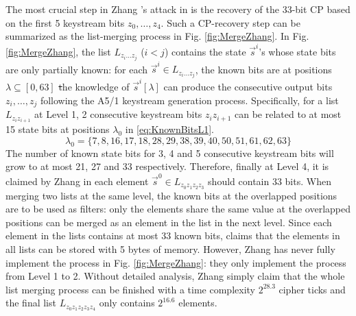 The most crucial step in Zhang \etal's attack in \cite{AC:Zhang19} is the recovery of the 33-bit CP based on the first 5 keystream bits $z_0,\ldots, z_4$.
Such a CP-recovery step can be summarized as the list-merging process in Fig. \ref{fig:MergeZhang}.
In Fig. \ref{fig:MergeZhang}, the list $L_{z_i\ldots z_j}$ ($i<j$) contains the state $\vec{s}^i$'s whose state bits are only partially known:
for each $\vec{s}^i\in L_{z_i\ldots z_j}$, the known bits are at positions $\lambda\subseteq [0,63]$ \st the knowledge of $\vec{s}^i[\lambda]$ can produce the consecutive output bits $z_i,\ldots, z_j$ following the A5/1 keystream generation process.
Specifically, for a list $L_{z_iz_{i+1}}$ at Level 1, 2 consecutive keystream bits $z_iz_{i+1}$ can be related to at most 15 state bits at positions $\lambda_0$ in \eqref{eq:KnownBitsL1}.
\begin{equation}\label{eq:KnownBitsL1}
\lambda_0=\{7,8,16,17,18,  28,29,38,39,40,  50,51,61,62,63\}
\end{equation}
The number of known state bits for 3, 4 and 5 consecutive keystream bits will grow to at most 21, 27 and 33 respectively.
Therefore, finally at Level 4, it is claimed by Zhang \etal in \cite{AC:Zhang19} each element $\vec{s}^0\in L_{z_0z_1z_2z_3}$ should contain 33 bits.
When merging two lists at the same level, the known bits at the overlapped positions are to be used as filters: only the elements share the same value at the overlapped positions can be merged as an element in the list in the next level.
Since each element in the lists contains at most 33 known bits, \cite{AC:Zhang19} claims that the elements in all lists can be stored with 5 bytes of memory.
However, Zhang \etal has never fully implement the process in Fig. \ref{fig:MergeZhang}:
they only implement the process from Level 1 to 2.
Without detailed analysis, Zhang \etal simply claim that the whole list merging process can be finished with a time complexity $2^{28.3}$ cipher ticks and the final list $L_{z_0z_1z_2z_3z_4}$ only contains $2^{16.6}$ elements.

